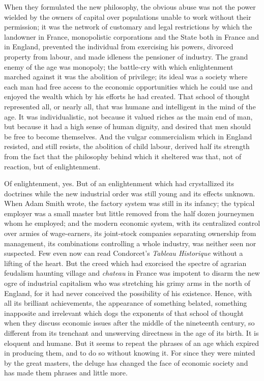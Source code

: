 \documentclass{book}
\begin{document}
When they formulated the new philosophy, the obvious abuse was not the power wielded by the owners of capital over populations unable to work without their permission; it was the network of customary and legal restrictions by which the landowner in France, monopolistic corporations and the State both in France and in England, prevented the individual from exercising his powers, divorced property from labour, and made idleness the pensioner of industry. The grand enemy of the age was monopoly; the battle-cry with which enlightenment marched against it was the abolition of privilege; its ideal was a society where each man had free access to the economic opportunities which he could use and enjoyed the wealth which by his efforts he had created. That school of thought represented all, or nearly all, that was humane and intelligent in the mind of the age. It was individualistic, not because it valued riches as the main end of man, but because it had a high sense of human dignity, and desired that men should be free to become themselves. And the vulgar commercialism which in England resisted, and still resists, the abolition of child labour, derived half its strength from the fact that the philosophy behind which it sheltered was that, not of reaction, but of enlightenment.

Of enlightenment, yes. But of an enlightenment which had crystallized its doctrines while the new industrial order was still young and its effects unknown. When Adam Smith wrote, the factory system was still in its infancy; the typical employer was a small master but little removed from the half dozen journeymen whom he employed; and the modern economic system, with its centralized control over armies of wage-earners, its joint-stock companies separating ownership from management, its combinations controlling a whole industry, was neither seen nor suspected. Few even now can read Condorcet’s \emph{Tableau Historique} without a lifting of the heart. But the creed which had exorcised the spectre of agrarian feudalism haunting village and \emph{chateau} in France was impotent to disarm the new ogre of industrial capitalism who was stretching his grimy arms in the north of England, for it had never conceived the possibility of his existence. Hence, with all its brilliant achievements, the appearance of something belated, something inapposite and irrelevant which dogs the exponents of that school of thought when they discuss economic issues after the middle of the nineteenth century, so different from its trenchant and unswerving directness in the age of its birth. It is eloquent and humane. But it seems to repeat the phrases of an age which expired in producing them, and to do so without knowing it. For since they were minted by the great masters, the deluge has changed the face of economic society and has made them phrases and little more.
\end{document}

